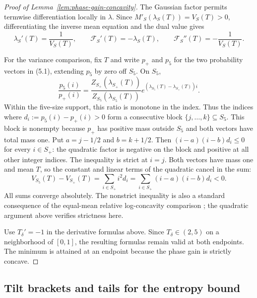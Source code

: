 \documentclass[a4paper,10pt,reqno]{amsart}
\numberwithin{equation}{section}
\theoremstyle{plain}
\theoremstyle{remark}
\begin{document}
\begin{proof}[Proof of Lemma~\ref{lem:phase-gain-concavity}]
The Gaussian factor permits termwise differentiation locally in $\lambda$.
Since $M'_S(\lambda_S(T))=V_S(T)>0$, differentiating the inverse mean equation and the dual
value gives
\[
 \lambda_S'(T)=\frac1{V_S(T)},\qquad
 \mathcal F_S'(T)=-\lambda_S(T),\qquad
 \mathcal F_S''(T)=-\frac1{V_S(T)}.
\]

For the variance comparison, fix $T$ and write $p_+$ and $p_5$ for the two
probability vectors in (5.1), extending $p_5$ by zero off $S_5$. On $S_5$,
\[
 \frac{p_5(i)}{p_+(i)}
 =\frac{Z_{S_+}(\lambda_{S_+}(T))}
        {Z_{S_5}(\lambda_{S_5}(T))}
   e^{(\lambda_{S_5}(T)-\lambda_{S_+}(T))i}.
\]
Within the five-size support, this ratio is monotone in the index.
Thus the indices where $d_i:=p_5(i)-p_+(i)>0$ form a consecutive block
$\{j,\ldots,k\}\subseteq S_5$. This block is nonempty because $p_+$ has
positive mass outside $S_5$ and both vectors have total mass one. Put
$a=j-1/2$ and $b=k+1/2$. Then $(i-a)(i-b)d_i\le0$ for every $i\in S_+$:
the quadratic factor is negative on the block and positive at all other
integer indices. The inequality is strict at $i=j$. Both vectors have mass one and mean $T$,
so the constant and linear terms of the quadratic cancel in the sum:
\[
 V_{S_5}(T)-V_{S_+}(T)
 =\sum_{i\in S_+}i^2d_i
 =\sum_{i\in S_+}(i-a)(i-b)d_i<0.
\]
All sums converge absolutely. The nonstrict inequality is also a standard
consequence of the equal-mean relative log-concavity comparison
\citep[Theorem~12]{Yu2010RelativeLogConcavity}; the quadratic argument
above verifies strictness here.

Use $T_\delta'= -1$ in the derivative formulas above. Since
$T_\delta\in(2,5)$ on a neighborhood of $[0,1]$, the resulting formulas
remain valid at both endpoints. The minimum is attained at an endpoint
because the phase gain is strictly concave.
\end{proof}

\subsection{Tilt brackets and tails for the entropy bound}
\label{app:entropy-certificate-details}
\end{document}
